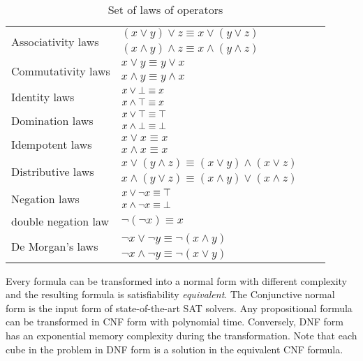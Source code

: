 \begin{table}[!htbp]
 \centering
 \begin{tabular}{lllc}
  \multirow{2}{*}{Associativity laws} & $(x \lor y) \lor z \equiv x \lor (y \lor z)$\\
          & $(x \land y) \land z \equiv x \land (y \land z)$\\
  \hline              
  \multirow{2}{*}{Commutativity laws} & $x \lor y \equiv y \lor x$\\
          & $x \land y \equiv y \land x$\\
  \hline      
  \multirow{2}{*}{Identity laws} & $x \lor \bot \equiv x$\\
           & $x \land \top \equiv x$\\
  \hline        
  \multirow{2}{*}{Domination laws} & $x \lor \top \equiv \top$\\
           &  $x \land \bot \equiv \bot$\\
  \hline        
  \multirow{2}{*}{Idempotent laws} & $x \lor x \equiv x$\\
               & $x \land x \equiv x$\\     
  \hline        
  \multirow{2}{*}{Distributive laws} & $x \lor (y \land z) \equiv (x \lor y) \land (x \lor z)$\\
           & $x \land (y \lor z) \equiv (x \land y) \lor (x \land z)$\\
 \hline        
 \multirow{2}{*}{Negation laws}  & $x \lor \neg x \equiv \top$\\
        & $x \land \neg x \equiv \bot$\\
  \hline
   double negation law & $\neg (\neg x) \equiv x$ \\
  \hline
  \multirow{2}{*}{De Morgan’s laws} & $\neg x \lor \neg y \equiv \neg (x \land y)$\\
            &  $\neg x \land \neg y \equiv \neg (x \lor y)$\\
 \end{tabular}
 \caption{Set of laws of operators}
 \label{tab:laws}
\end{table}
Every formula can be transformed into a normal form with different complexity and the resulting formula is 
satisfiability \emph{equivalent}.
The Conjunctive normal form is the input form of state-of-the-art SAT solvers. Any propositional
formula can be transformed in CNF form with polynomial time\cite{Russell1994ArtiCI}. Conversely, DNF form has
an exponential memory complexity during the transformation\cite{darwiche2002knowledge}.
Note that each cube in the problem in DNF form is a solution in the equivalent CNF formula.
